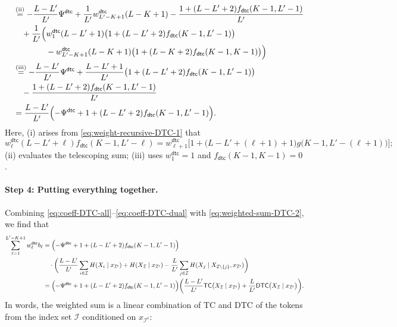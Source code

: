 \documentclass[english]{article}
\newcommand{\cI}{\mathcal{I}}
\newcommand{\TC}{\mathsf{TC}}
\newcommand{\DTC}{\mathsf{DTC}}
\newcommand{\dtc}{\mathsf{dtc}}
\begin{document}
\begin{itemize}
\begin{align}
&\quad \stackrel{\text{(ii)}}{=} -\frac{L-L'}{L'} \Psi^\dtc +\frac{1}{L'}w^\dtc_{L'-K+1} (L-K+1) - \frac{1+(L-L'+2)f_\dtc(K-1, L'-1)}{L'} \notag\\
& \quad \quad + \frac{1}{L'} \Big( w^\dtc_1 (L-L'+1)\big(1 + (L-L'+2)f_\dtc(K-1, L'-1)\big) \notag \\
&\hspace{5em} - w^\dtc_{L'-K+1} (L-K+1)\big(1 + (L-K+2)f_\dtc(K-1, K-1)\big) \Big) \notag \\
&\quad \stackrel{\text{(iii)}}{=} -\frac{L-L'}{L'} \Psi^\dtc + \frac{L-L'+1}{L'} \big(1 + (L-L'+2)f_\dtc(K-1, L'-1)\big) \notag\\ 
& \quad \quad- \frac{1 + (L-L'+2)f_\dtc(K-1, L'-1)}{L'}\notag \\
&\quad = \frac{L-L'}{L'}\Bigl(-\Psi^\dtc + 1 + (L-L'+2)f_\dtc(K-1,L'-1)\Bigr). \label{eq:coeff-DTC-single}
\end{align}
Here, (i) arises from \eqref{eq:weight-recursive-DTC-1} that
$$ w^\dtc_{\ell} (L-L'+\ell)f_\dtc(K-1, L'-\ell) = w^\dtc_{\ell + 1} \big[1 + \big(L-L'+(\ell + 1)+1\big)g\big(K-1, L'-(\ell + 1)\big)\big]; $$
(ii) evaluates the telescoping sum; (iii) uses $w^\dtc_1 = 1$ and $f_\dtc(K-1,K-1) = 0$.

\end{itemize}

\paragraph{Step 4: Putting everything together.}
Combining \eqref{eq:coeff-DTC-all}--\eqref{eq:coeff-DTC-dual} with \eqref{eq:weighted-sum-DTC-2}, we find that
\begin{align}
\sum_{\ell = 1}^{L'-K+1} w^\dtc_{\ell} b_{\ell}
& = \Bigl(-\Psi^\dtc + 1 + (L-L'+2)f_\dtc(K-1, L'-1)\Bigr) \notag\\
& \quad \cdot\bigg(\frac{L-L'}{L'}\sum_{i \in \cI} H(X_i \mid x_{\cI^\mathsf{c}}) + H(X_{\cI} \mid x_{\cI^\mathsf{c}}) - \frac{L}{L'} \sum_{j \in \cI} H(X_j \mid X_{\cI \setminus \{j\}}, x_{\cI^\mathsf{c}})\bigg) \notag\\
& = \Bigl(-\Psi^\dtc + 1 + (L-L'+2)f_\dtc(K-1, L'-1)\Bigr) \biggl( \frac{L-L'}{L'}\TC\big(X_{\cI} \mid x_{\cI^\mathsf{c}} \big) + \frac{L}{L'}\DTC\big(X_{\cI} \mid x_{\cI^\mathsf{c}} \big)\biggr). \label{eq:weighted-sum-DTC}
\end{align}
In words, the weighted sum is a linear combination of TC and DTC of the tokens from the index set $ \cI $ conditioned on $ x_{\cI^\mathsf{c}} $: 
\end{document}
